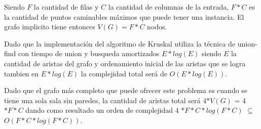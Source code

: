 Siendo $F$ la cantidad de filas y $C$ la cantidad de columnas de la entrada, $F \ast C$ es la cantidad de puntos caminables máximos que puede tener una instancia. El grafo implicito tiene entonces $V(G) = F \ast C $ nodos.

Dado que la implementación del algoritmo de Kruskal utiliza la técnica de union-find con tiempo de union y busqueda amortizados $E \ast log(E)$ siendo $E$ la cantidad de aristas del grafo y  ordenamiento inicial de las aristas que se logra tambien en $E \ast log(E)$ la complejidad total será de $O(E \ast log(E))$.

Dado que el grafo más completo que puede ofrecer este problema es cuando se tiene una sola sala sin paredes, la cantidad de aristas total será 4$\ast  V(G)$ = 4$\ast  F \ast C$ dando como resultado un orden de complejidad 4 $\ast F \ast C \ast log(F \ast C)$ $\subseteq$ $O(F \ast C \ast log(F \ast C))$.
